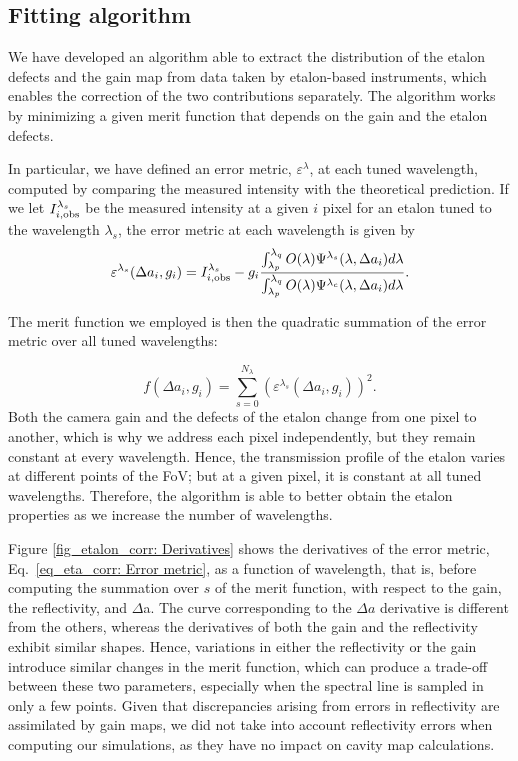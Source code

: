 \subsection{\label{eta_corr_susec: fitting algorithm}Fitting algorithm}

We have developed an algorithm able to extract the distribution of the etalon defects and the gain map from data taken by etalon-based instruments, which enables the correction of the two contributions separately. The algorithm works by minimizing a given merit function that depends on the gain and the etalon defects. 

In particular, we have defined an error metric, $\varepsilon  ^\lambda$, at each tuned wavelength, computed by comparing the measured intensity with the theoretical prediction. If we let $I_ {i, {\rm obs}} ^{\lambda _s}$ be the measured intensity at a given $i$ pixel for an etalon tuned to the wavelength $\lambda_s$, the error metric at each wavelength is given by
\begin{equation}
\varepsilon ^{\lambda _s} (\Delta a _i, g _ i) =  I _ {i, {\rm obs}} ^{\lambda _ s} - g_i \frac{\int_{\lambda_p}^{\lambda_q} O(\lambda)\Psi^{\lambda _ s} (\lambda, \Delta a _ i)  d\lambda}{\int_{\lambda_p}^{\lambda_q} O(\lambda)\Psi^{\lambda _ c} (\lambda, \Delta a _ i)  d\lambda}
\label{eq_eta_corr: Error metric}.
\end{equation}

The merit function we employed is then the quadratic summation of the error metric over all tuned wavelengths:

\begin{equation}
f(\Delta a _i, g _ i) = \sum _ {s = 0} ^ {N_\lambda} \left( \varepsilon ^{\lambda _s} (\Delta a _i, g _ i) \right) ^ 2.  
\label{eq_eta_corr: Merit Function}
\end{equation}
Both the camera gain and the defects of the etalon change from one pixel to another, which is why we address each pixel independently, but they remain constant at every wavelength. Hence, the transmission profile of the etalon varies at different points of the FoV; but at a given pixel, it is constant at all tuned wavelengths. Therefore, the algorithm is able to better obtain the etalon properties as we increase the number of wavelengths.

Figure \ref{fig_etalon_corr: Derivatives} shows the derivatives of the error metric, Eq.~\eqref{eq_eta_corr: Error metric}, as a function of wavelength, that is, before computing the summation over $s$ of the merit function, with respect to the gain, the reflectivity, and $\Delta $a. The curve corresponding to the $\Delta a$ derivative is different from the others, whereas the derivatives of both the gain and the reflectivity exhibit similar shapes. Hence, variations in either the reflectivity or the gain introduce similar changes in the merit function, which can produce a trade-off between these two parameters, especially when the spectral line is sampled in only a few points. Given that discrepancies arising from errors in reflectivity are assimilated by gain maps, we did not take into account reflectivity errors when computing our simulations, as they have no impact on cavity map calculations.


